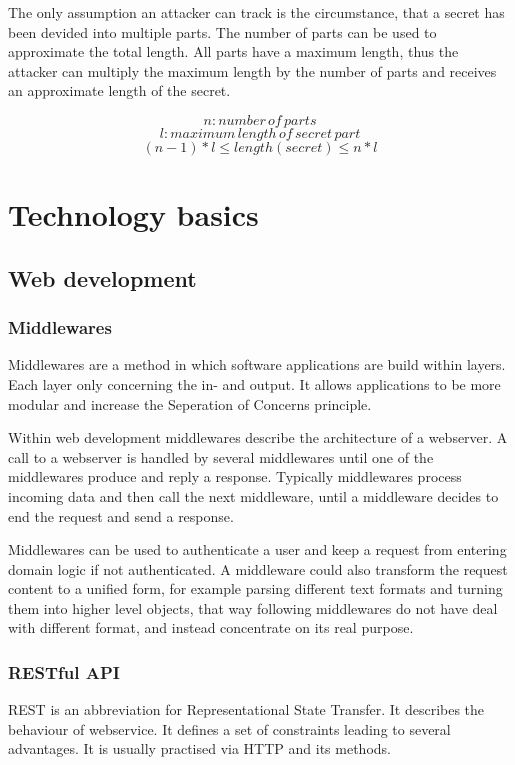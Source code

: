 The only assumption an attacker can track is the circumstance, that a secret
has been devided into multiple parts. The number of parts can be used to
approximate the total length. All parts have a maximum length, thus the
attacker can multiply the maximum length by the number of parts and receives an
approximate length of the secret.

$$n: number\,of\,parts$$
$$l: maximum\,length\,of\,secret\,part$$
$$(n - 1) * l \leq length(secret) \leq n * l$$

\chapter{Technology basics}
\section{Web development}
\subsection{Middlewares}

Middlewares are a method in which software applications are build within
layers. Each layer only concerning the in- and output. It allows applications
to be more modular and increase the Seperation of Concerns principle.

Within web development middlewares describe the architecture of a webserver.  A
call to a webserver is handled by several middlewares until one of the
middlewares produce and reply a response. Typically middlewares process
incoming data and then call the next middleware, until a middleware decides to
end the request and send a response.

Middlewares can be used to authenticate a user and keep a request from entering
domain logic if not authenticated. A middleware could also transform the
request content to a unified form, for example parsing different text formats
and turning them into higher level objects, that way following middlewares do
not have deal with different format, and instead concentrate on its real
purpose.

\subsection{RESTful API}

REST is an abbreviation for Representational State Transfer. It describes the
behaviour of webservice. It defines a set of constraints leading to several
advantages. It is usually practised via HTTP and its methods.

